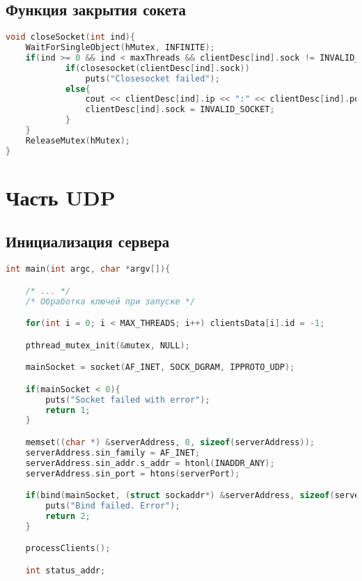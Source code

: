\begin{append}
\subsection{Функция закрытия сокета} \label{app:close}

\begin{lstlisting}[language=C, label=lst:createserver]
void closeSocket(int ind){
    WaitForSingleObject(hMutex, INFINITE);
    if(ind >= 0 && ind < maxThreads && clientDesc[ind].sock != INVALID_SOCKET){
            if(closesocket(clientDesc[ind].sock))
                puts("Closesocket failed");
            else{
                cout << clientDesc[ind].ip << ":" << clientDesc[ind].port << " was disconnected" << endl;
                clientDesc[ind].sock = INVALID_SOCKET;
            }
    }
    ReleaseMutex(hMutex);
}
\end{lstlisting}

\section{Часть UDP} 
\subsection{Инициализация сервера} \label{app:createserverudp}

\begin{lstlisting}[language=C, label=lst:createserver]
int main(int argc, char *argv[]){

    /* ... */
    /* Обработка ключей при запуске */

    for(int i = 0; i < MAX_THREADS; i++) clientsData[i].id = -1;

    pthread_mutex_init(&mutex, NULL);

    mainSocket = socket(AF_INET, SOCK_DGRAM, IPPROTO_UDP);

    if(mainSocket < 0){
        puts("Socket failed with error");
        return 1;
    }

    memset((char *) &serverAddress, 0, sizeof(serverAddress));
    serverAddress.sin_family = AF_INET;
    serverAddress.sin_addr.s_addr = htonl(INADDR_ANY);
    serverAddress.sin_port = htons(serverPort);

    if(bind(mainSocket, (struct sockaddr*) &serverAddress, sizeof(serverAddress)) < 0){
        puts("Bind failed. Error");
        return 2;
    }

    processClients();

    int status_addr;


\end{lstlisting}
\end{append}

